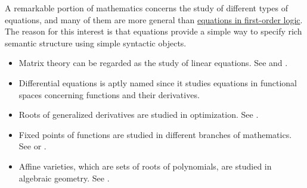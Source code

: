 \begin{example}\label{ex:equations}
  A remarkable portion of mathematics concerns the study of different types of equations, and many of them are more general than \hyperref[def:first_order_equation]{equations in first-order logic}. The reason for this interest is that equations provide a simple way to specify rich semantic structure using simple syntactic objects.

  \begin{itemize}
    \item Matrix theory can be regarded as the study of linear equations. See  and .
    \item Differential equations is aptly named since it studies equations in functional spaces concerning functions and their derivatives.
    \item Roots of generalized derivatives are studied in optimization. See .
    \item Fixed points of functions are studied in different branches of mathematics. See  or .
    \item Affine varieties, which are sets of roots of polynomials, are studied in algebraic geometry. See .
  \end{itemize}
\end{example}

